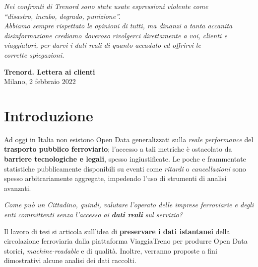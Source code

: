\documentclass[12pt,a4paper,italian]{report}
\begin{document}

\frontespizio \beforepreface


\hfill
\begin{minipage}{8.5cm}
    \setlength\epigraphwidth{\linewidth} \epigraph{%
        \large\sl Nei confronti di Trenord
        sono state usate espressioni violente come \\
        ``disastro, incubo, degrado, punizione''.\\
        \bigskip Abbiamo sempre rispettato le opinioni di tutti, ma
        dinanzi a tanta accanita disinformazione crediamo doveroso
        rivolgerci direttamente a voi, clienti e viaggiatori, per
        darvi i dati \textit{reali} di quanto accaduto ed offrirvi le \\
        \textit{corrette} spiegazioni.}{%
        \textrm{\textbf{Trenord. Lettera ai clienti}\\
            Milano, 2 febbraio 2022~\cite{TrenordLettera}} }
\end{minipage}
	
	
\afterpreface
	
\listoftodos
	
\chapter{Introduzione}

Ad oggi in Italia non esistono Open Data generalizzati sulla
\textit{reale performance} del \textbf{trasporto pubblico
    ferroviario}; l'accesso a tali metriche è ostacolato da
\textbf{barriere tecnologiche e legali}, spesso ingiustificate.  Le
poche e frammentate statistiche pubblicamente disponibili su eventi
come \textit{ritardi} o \textit{cancellazioni} sono spesso
arbitrariamente aggregate, impedendo l'uso di strumenti di analisi
avanzati.

\textit{Come può un Cittadino, quindi, valutare l'operato delle
    imprese ferroviarie e degli enti committenti senza l'accesso ai
    \textbf{dati reali} sul servizio?}

Il lavoro di tesi si articola sull’idea di \textbf{preservare i dati
    istantanei} della circolazione ferroviaria dalla piattaforma
ViaggiaTreno per produrre Open Data storici, \textit{machine-readable}
e di qualità.  Inoltre, verranno proposte a fini dimostrativi alcune
analisi dei dati raccolti.
\end{document}
